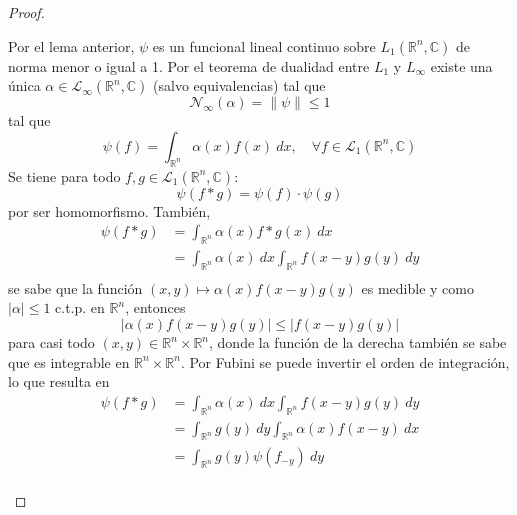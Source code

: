 \documentclass[12pt]{report}
\newcounter{it}
\theoremstyle{largebreak}
\renewcommand{\leq}{\ensuremath{\leqslant}}
\newcommand\abs[1]{\ensuremath{\left|#1\right|}}
\newcommand\norm[1]{\ensuremath{\|#1\|}}
\newcommand{\N}[2]{\ensuremath{\mathcal{N}_{#1}\left(#2\right)}}
\begin{document}
\begin{proof}
\begin{enumerate}
            Por el lema anterior, $\psi$ es un funcional lineal continuo sobre $L_1(\mathbb{R}^n,\mathbb{C})$ de norma menor o igual a 1. Por el teorema de dualidad entre $L_1$ y $L_{\infty}$ existe una única $\alpha\in\mathcal{L}_{\infty}(\mathbb{R}^n,\mathbb{C})$ (salvo equivalencias) tal que
            \begin{equation*}
                \N{\infty}{\alpha}=\norm{\psi}\leq1
            \end{equation*}
            tal que
            \begin{equation*}
                \psi(f)=\int_{\mathbb{R}^n}\alpha(x)f(x)\:dx,\quad\forall f\in\mathcal{L}_{1}(\mathbb{R}^n,\mathbb{C})
            \end{equation*}
            Se tiene para todo $f,g\in\mathcal{L}_{1}(\mathbb{R}^n,\mathbb{C})$:
            \begin{equation*}
                \psi(f*g)=\psi(f)\cdot\psi(g)
            \end{equation*}
            por ser homomorfismo. También,
            \begin{equation*}
                \begin{split}
                    \psi(f*g)&=\int_{\mathbb{R}^n}\alpha(x)f*g(x)\:dx\\
                    &=\int_{\mathbb{R}^n}\alpha(x)\:dx\int_{\mathbb{R}^n}f(x-y)g(y)\:dy\\
                \end{split}
            \end{equation*}
            se sabe que la función $(x,y)\mapsto\alpha(x)f(x-y)g(y)$ es medible y como $\abs{\alpha}\leq1$ c.t.p. en $\mathbb{R}^n$, entonces
            \begin{equation*}
                \abs{\alpha(x)f(x-y)g(y)}\leq\abs{f(x-y)g(y)}
            \end{equation*}
            para casi todo $(x,y)\in\mathbb{R}^n\times\mathbb{R}^n$, donde la función de la derecha también se sabe que es integrable en $\mathbb{R}^n\times\mathbb{R}^n$. Por Fubini se puede invertir el orden de integración, lo que resulta en
            \begin{equation*}
                \begin{split}
                    \psi(f*g)&=\int_{\mathbb{R}^n}\alpha(x)\:dx\int_{\mathbb{R}^n}f(x-y)g(y)\:dy\\
                    &=\int_{\mathbb{R}^n}g(y)\:dy\int_{\mathbb{R}^n}\alpha(x)f(x-y)\:dx\\
                    &=\int_{\mathbb{R}^n} g(y)\psi(f_{ -y})\:dy\\

\end{split}
\end{equation*}
\end{enumerate}
\end{proof}
\end{document}
